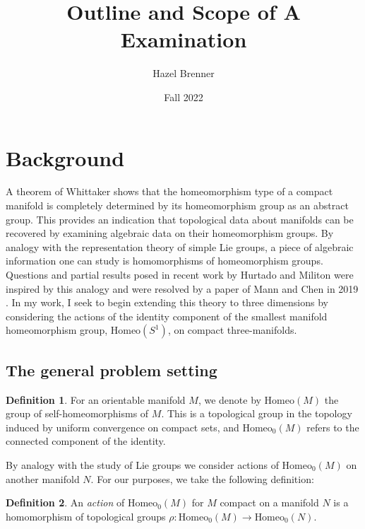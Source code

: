 \documentclass[10pt, oneside]{article}
\title{Outline and Scope of A Examination}
\author{Hazel Brenner}
\date{Fall 2022}
\theoremstyle{definition}
\newtheorem{defn}{Definition}
\theoremstyle{definition}
\begin{document}
\maketitle

\section{Background}


A theorem of Whittaker \cite{whittaker-homeo-groups} shows that the homeomorphism type of a compact manifold is completely determined by its homeomorphism group as an abstract group. This provides an indication that topological data about manifolds can be recovered by examining algebraic data on their homeomorphism groups. By analogy with the representation theory of simple Lie groups, a piece of algebraic information one can study is homomorphisms of homeomorphism groups. Questions and partial results posed in recent work by Hurtado \cite{hurtado} and Militon \cite{militon} were inspired by this analogy and were resolved by a paper of Mann and Chen in 2019 \cite{mann-chen}. In my work, I seek to begin extending this theory to three dimensions by considering the actions of the identity component of the smallest manifold homeomorphism group, $\text{Homeo}(S^1)$, on compact three-manifolds.

\subsection{The general problem setting}

\begin{defn}
    For an orientable manifold $M$, we denote by $\text{Homeo}(M)$ the group of self-homeomorphisms of $M$. This is a topological group in the topology induced by uniform convergence on compact sets, and $\text{Homeo}_0(M)$ refers to the connected component of the identity.
\end{defn}

By analogy with the study of Lie groups we consider actions of $\text{Homeo}_0(M)$ on another manifold $N$. For our purposes, we take the following definition:

\begin{defn}
    An {\it action} of $\mathrm{Homeo}_0(M)$ for $M$ compact on a manifold $N$ is a homomorphism of topological groups $\rho: \text{Homeo}_0(M) \to \text{Homeo}_0(N)$.
\end{defn}
\end{document}
